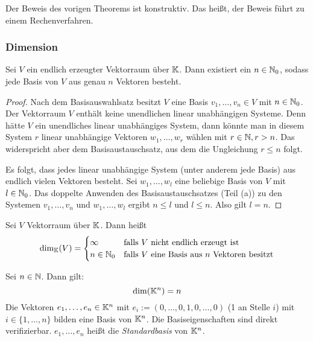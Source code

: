 \begin{bem} 
	Der Beweis des vorigen Theorems ist konstruktiv. Das heißt, der Beweis führt zu einem Rechenverfahren. 
\end{bem} 

\subsubsection{Dimension}

\begin{klr}
	Sei $ V $ ein endlich erzeugter Vektorraum über $ \mathbb K $. Dann existiert ein $ n \in \mathbb N_0 $, sodass jede Basis von $ V $ aus genau $ n $ Vektoren besteht.
\end{klr}
\begin{proof}
	Nach dem Basisauswahlsatz besitzt $ V $ eine Basis $ v_1, \ldots, v_n \in V $ mit $ n \in \mathbb N_0 $. Der Vektorraum $ V $ enthält keine unendlichen linear unabhängigen Systeme. Denn hätte $ V $ ein unendliches linear unabhängiges System, dann könnte man in diesem System $ r $ linear unabhängige Vektoren $ w_1, \ldots, w_r $ wählen mit $ r \in \mathbb N, r > n $. Das widerspricht aber dem Basisaustauschsatz, aus dem die Ungleichung $ r \leq n $ folgt.
	
	Es folgt, dass jedes linear unabhängige System (unter anderem jede Basis) aus endlich vielen Vektoren besteht. Sei $ w_1, \ldots,w_l $ eine beliebige Basis von $ V $ mit $ l \in \mathbb N_0 $. Das doppelte Anwenden des Basisaustauschsatzes (Teil (a)) zu den Systemen $ v_1, \ldots, v_n $ und $w_1, \ldots, w_l $ ergibt $ n \leq l $ und $ l \leq n $. Also gilt $ l = n $.
\end{proof}

\noindent Sei $ V $ Vektorraum über $ \mathbb K $. Dann heißt
\begin{equation}
	\dim_\mathbb K(V) =
	\begin{cases}
		\infty & \text{falls $ V $ nicht endlich erzeugt ist}\\
		n \in \mathbb N_0 & \text{falls $ V $ eine Basis aus $ n $ Vektoren besitzt}
	\end{cases}
\end{equation}

\begin{bem}
	Sei $ n \in \mathbb N $. Dann gilt:
	\begin{equation}
		\dim(\mathbb K^n) = n
	\end{equation}
	Die Vektoren $ e_1, \ldots, e_n \in \mathbb K^n $ mit $ e_i := (0,\ldots,0,1,0,\ldots,0) $ (1 an Stelle $ i $) mit $ i \in \{ 1, \ldots, n \} $ bilden eine Basis von $ \mathbb K^n $. Die Basiseigenschaften sind direkt verifizierbar. $ e_1, \ldots, e_n $ heißt die \emph{Standardbasis} von $ \mathbb K^n $.
\end{bem}

